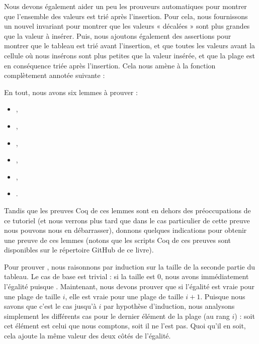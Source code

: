 Nous devons également aider un peu les prouveurs automatiques pour montrer
que l'ensemble des valeurs est trié après l'insertion. Pour cela, nous fournissons
un nouvel invariant pour montrer que les valeurs « décalées » sont plus grandes
que la valeur à insérer. Puis, nous ajoutons également des assertions pour
montrer que le tableau est trié avant l'insertion, et que toutes les valeurs
avant la cellule où nous insérons sont plus petites que la valeur insérée, et
que la plage est en conséquence triée après l'insertion. Cela nous amène à
la fonction  complètement annotée suivante :






En tout, nous avons six lemmes à prouver :
\begin{itemize}
\item {},
\item {},
\item {},
\item {},
\item {},
\item {}.
\end{itemize}


Tandis que les preuves Coq de ces lemmes sont en dehors des préoccupations de ce
tutoriel (et nous verrons plus tard que dans le cas particulier de cette preuve
nous pouvons nous en débarrasser), donnons quelques indications pour obtenir une
preuve de ces lemmes (notons que les scripts Coq de ces preuves sont disponibles
sur le répertoire GitHub de ce livre).


Pour prouver , nous raisonnons par induction
sur la taille de la seconde partie du tableau. Le cas de base est trivial : si
la taille est 0, nous avons immédiatement l'égalité puisque .
Maintenant, nous devons prouver que si l'égalité est vraie pour une plage de taille
$i$, elle est vraie pour une plage de taille $i+1$. Puisque nous savons que c'est
le cas jusqu'à $i$ par hypothèse d'induction, nous analysons simplement les
différents cas pour le dernier élément de la plage (au rang $i$) : soit cet élément
est celui que nous comptons, soit il ne l'est pas. Quoi qu'il en soit, cela ajoute
la même valeur des deux côtés de l'égalité.


